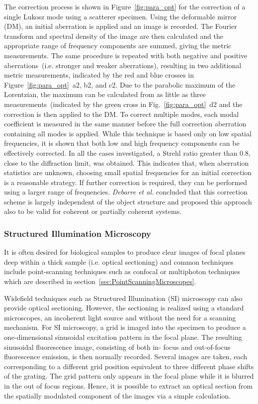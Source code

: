 The correction process is shown in Figure~\ref{fig:para_opt} for the correction of a single Lukosz mode using a scatterer specimen. Using the deformable mirror (DM), an initial aberration is applied and an image is recorded. The Fourier transform and spectral density of the image are then calculated and the appropriate range of frequency components are summed, giving the metric measurements. The same procedure is repeated with both negative and positive aberrations~(i.e. stronger and weaker aberrations), resulting in two additional metric measurements, indicated by the red and blue crosses in Figure~\ref{fig:para_opt}~a2, b2, and c2. Due to the parabolic maximum of the Lorentzian, the maximum can be calculated from as little as three measurements~(indicated by the green cross in Fig.~\ref{fig:para_opt}~d2 and the correction is then applied to the DM. To correct multiple modes, each modal coefficient is measured in the same manner before the full correction aberration containing all modes is applied. While this technique is based only on low spatial frequencies, it is shown that both low and high frequency components can be effectively corrected. In all the cases investigated, a Strehl ratio greater than 0.8, close to the diffraction limit, was obtained. This indicates that, when aberration statistics are unknown, choosing small spatial frequencies for an initial correction is a reasonable strategy. If further correction is required, they can be performed using a larger range of frequencies. \emph{Debarre et al.} concluded that this correction scheme is largely independent of the object structure and proposed this approach also to be valid for coherent or partially coherent systems.

\subsubsection{Structured Illumination Microscopy}
\label{sec:StructuredIlluminationMicroscopy}

It is often desired for biological samples to produce clear images of focal planes deep within a thick sample (i.e. optical sectioning) and common techniques include point-scanning techniques such as confocal or multiphoton techniques which are described in section~\ref{sec:PointScanningMicroscopes}. 

Widefield techniques such as Structured Illumination (SI) microscopy can also provide optical sectioning. However, the sectioning is realized using a standard microscopes, an incoherent light source and without the need for a scanning mechanism. For SI microscopy, a grid is imaged into the specimen to produce a one-dimensional sinusoidal excitation pattern in the focal plane. The resulting sinusoidal fluorescence image, consisting of both in- focus and out-of-focus fluorescence emission, is then normally recorded. Several images are taken, each corresponding to a different grid position equivalent to three different phase shifts of the grating. The grid pattern only appears in the focal plane while it is blurred in the out of focus regions. Hence, it is possible to extract an optical section from the spatially modulated component of the images via a simple calculation.

